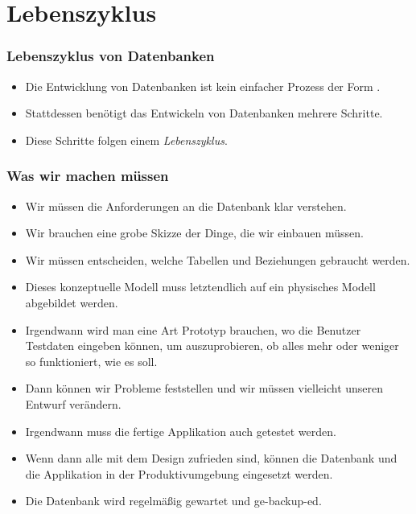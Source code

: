 \documentclass[aspectratio=169,mathserif,notheorems]{beamer}%
\begin{document}
\section{Lebenszyklus}%
%
\begin{frame}%
\frametitle{Lebenszyklus von Datenbanken}%
\begin{itemize}%
%
\item Die Entwicklung von Datenbanken ist kein einfacher Prozess der Form .%
%
\item<2-> Stattdessen benötigt das Entwickeln von Datenbanken mehrere Schritte.%
%
\item<3-> Diese Schritte folgen einem \emph{Lebenszyklus}.%
%
\end{itemize}%
\end{frame}%
%
\begin{frame}%
\frametitle{Was wir machen müssen}%
\begin{itemize}%
\item Wir müssen die Anforderungen an die Datenbank klar verstehen.%
%
\item<2-> Wir brauchen eine grobe Skizze der Dinge, die wir einbauen müssen.%
%
\item<3-> Wir müssen entscheiden, welche Tabellen und Beziehungen gebraucht werden.%
%
\item<4-> Dieses konzeptuelle Modell muss letztendlich auf ein physisches Modell abgebildet werden.%
%
\item<5-> Irgendwann wird man eine Art Prototyp brauchen, wo die Benutzer Testdaten eingeben können, um auszuprobieren, ob alles mehr oder weniger so funktioniert, wie es soll.%
%
\item<6-> Dann können wir Probleme feststellen und wir müssen vielleicht unseren Entwurf verändern.%
%
\item<7-> Irgendwann muss die fertige Applikation auch getestet werden.%
%
\item<8-> Wenn dann alle mit dem Design zufrieden sind, können die Datenbank und die Applikation in der Produktivumgebung eingesetzt werden.%
%
\item<9-> Die Datenbank wird regelmäßig gewartet und ge-backup-ed.%
\end{itemize}%
\end{frame}%
%
\end{document}
